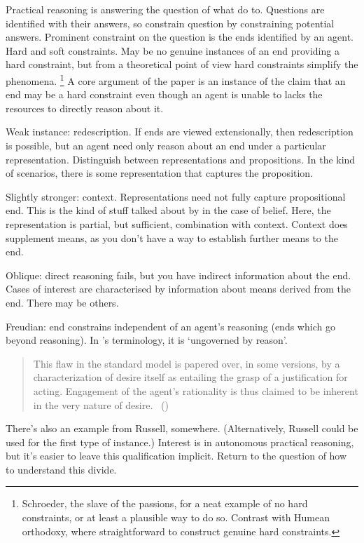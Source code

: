 \documentclass[10pt]{article}
\begin{document}
\newpage










Practical reasoning is answering the question of what do to.
Questions are identified with their answers, so constrain question by constraining potential answers.
Prominent constraint on the question is the ends identified by an agent.
Hard and soft constraints.
May be no genuine instances of an end providing a hard constraint, but from a theoretical point of view hard constraints simplify the phenomena.\nolinebreak
\footnote{Schroeder, the slave of the passions, for a neat example of no hard constraints, or at least a plausible way to do so.
Contrast with Humean orthodoxy, where straightforward to construct genuine hard constraints.}
A core argument of the paper is an instance of the claim that an end may be a hard constraint even though an agent is unable to lacks the resources to directly reason about it.

Weak instance: redescription.
If ends are viewed extensionally, then redescription is possible, but an agent need only reason about an end under a particular representation.
Distinguish between representations and propositions.
In the kind of scenarios, there is some representation that captures the proposition.

Slightly stronger: context.
Representations need not fully capture propositional end.
This is the kind of stuff talked about by \citeauthor{Perry:1986aa} in the case of belief.
Here, the representation is partial, but sufficient, combination with context.
Context does supplement means, as you don't have a way to establish further means to the end.

Oblique: direct reasoning fails, but you have indirect information about the end.
Cases of interest are characterised by information about means derived from the end.
There may be others.

Freudian: end constrains independent of an agent's reasoning (ends which go beyond reasoning).
In \citeauthor{Velleman:2000ab}'s terminology, it is `ungoverned by reason'.
\begin{quote}
  This flaw in the standard model is papered over, in some versions, by a characterization of desire itself as entailing the grasp of a justification for acting.
  Engagement of the agent’s rationality is thus claimed to be inherent in the very nature of desire.\nolinebreak
  \mbox{ }\hfill(\cite[9]{Velleman:2000ab})
\end{quote}
There's also an example from Russell, somewhere.
(Alternatively, Russell could be used for the first type of instance.)
Interest is in autonomous practical reasoning, but it's easier to leave this qualification implicit.
Return to the question of how to understand this divide.
\end{document}
